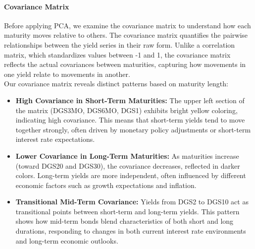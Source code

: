 \documentclass[12pt]{article}
\begin{document}
\paragraph{Covariance Matrix}

Before applying PCA, we examine the covariance matrix to understand how each maturity moves relative to others. The covariance matrix quantifies the pairwise relationships between the yield series in their raw form. Unlike a correlation matrix, which standardizes values between -1 and 1, the covariance matrix reflects the actual covariances between maturities, capturing how movements in one yield relate to movements in another. \\

Our covariance matrix reveals distinct patterns based on maturity length:
\begin{itemize}
    \item \textbf{High Covariance in Short-Term Maturities:} The upper left section of the matrix (DGS3MO, DGS6MO, DGS1) exhibits bright yellow coloring, indicating high covariance. This means that short-term yields tend to move together strongly, often driven by monetary policy adjustments or short-term interest rate expectations.
    \item \textbf{Lower Covariance in Long-Term Maturities:} As maturities increase (toward DGS20 and DGS30), the covariance decreases, reflected in darker colors. Long-term yields are more independent, often influenced by different economic factors such as growth expectations and inflation.
    \item \textbf{Transitional Mid-Term Covariance:} Yields from DGS2 to DGS10 act as transitional points between short-term and long-term yields. This pattern shows how mid-term bonds blend characteristics of both short and long durations, responding to changes in both current interest rate environments and long-term economic outlooks.
\end{itemize}
\end{document}

